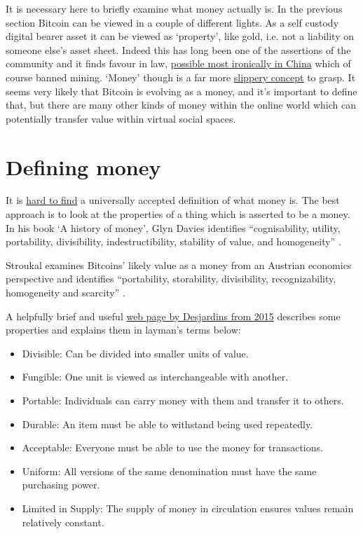 It is necessary here to briefly examine what money actually is. In the previous section Bitcoin can be viewed in a couple of different lights. As a self custody digital bearer asset it can be viewed as `property', like gold, i.e. not a liability on someone else's asset sheet. Indeed this has long been one of the assertions of the community and it finds favour in law, \href{https://www.regulationasia.com/shanghai-court-says-bitcoin-is-protected-by-law-as-virtual-property/}{possible most ironically in China} which of course banned mining. `Money' though is a far more \href{https://www.bankofengland.co.uk/knowledgebank/what-is-money}{slippery concept} to grasp. It seems very likely that Bitcoin is evolving as a money, and it's important to define that, but there are many other kinds of money within the online world which can potentially transfer value within virtual social spaces.
\section{Defining money}
It is \href{https://www.lynalden.com/what-is-money/}{hard to find} a universally accepted definition of what money is. The best approach is to look at the properties of a thing which is asserted to be a money. In his book `A history of money', Glyn Davies identifies ``cognisability, utility,  portability, divisibility, indestructibility, stability of value, and homogeneity'' \cite{davies2010history}.\par
Stroukal examines Bitcoins' likely value as a money from an Austrian economics perspective and identifies ``portability, storability, divisibility, recognizability, homogeneity and scarcity'' \cite{stroukal2018can}.\par
A helpfully brief and useful \href{http://money.visualcapitalist.com/infographic-the-properties-of-money/}{web page by Desjardins from 2015} describes some properties and explains them in layman's terms below:
\begin{itemize}
\item Divisible: Can be divided into smaller units of value.
\item Fungible: One unit is viewed as interchangeable with another.
\item Portable: Individuals can carry money with them and transfer it to others.
\item Durable: An item must be able to withstand being used repeatedly.
\item Acceptable: Everyone must be able to use the money for transactions.
\item Uniform: All versions of the same denomination must have the same purchasing power.
\item Limited in Supply: The supply of money in circulation ensures values remain relatively constant.
\end{itemize}
